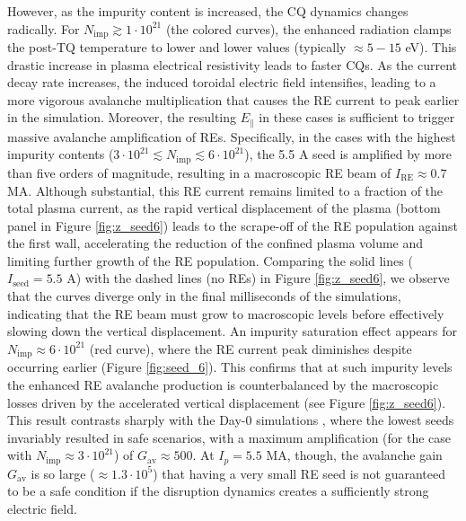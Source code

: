 \documentclass[aip,reprint]{revtex4-1}
\begin{document}
However, as the impurity content is increased, the CQ dynamics changes radically. For $N_\text{imp} \gtrsim 1\cdot10^{21}$ (the colored curves), the enhanced radiation clamps the post-TQ temperature to lower and lower values (typically $\approx 5-15$ eV). This drastic increase in plasma electrical resistivity leads to faster CQs. As the current decay rate increases, the induced toroidal electric field intensifies, leading to a more vigorous avalanche multiplication that causes the RE current to peak earlier in the simulation. Moreover, the resulting $E_\parallel$ in these cases is sufficient to trigger massive avalanche amplification of REs. Specifically, in the cases with the highest impurity contents ($3\cdot10^{21} \lesssim N_\text{imp} \lesssim 6\cdot10^{21}$), the 5.5 A seed is amplified by more than five orders of magnitude, resulting in a macroscopic RE beam of $I_\text{RE} \approx 0.7$ MA. Although substantial, this RE current remains limited to a fraction of the total plasma current, as the rapid vertical displacement of the plasma (bottom panel in Figure \ref{fig:z_seed6}) leads to the scrape-off of the RE population against the first wall, accelerating the reduction of the confined plasma volume and limiting further growth of the RE population. Comparing the solid lines ($I_\text{seed}=5.5$ A) with the dashed lines (no REs) in Figure \ref{fig:z_seed6}, we observe that the curves diverge only in the final milliseconds of the simulations, indicating that the RE beam must grow to macroscopic levels before effectively slowing down the vertical displacement. An impurity saturation effect appears for $N_\text{imp} \approx 6\cdot10^{21}$ (red curve), where the RE current peak diminishes despite occurring earlier (Figure \ref{fig:seed_6}). This confirms that at such impurity levels the enhanced RE avalanche production is counterbalanced by the macroscopic losses driven by the accelerated vertical displacement (see Figure \ref{fig:z_seed6}). This result contrasts sharply with the Day-0 simulations \cite{Emanuelli2025}, where the lowest seeds invariably resulted in safe scenarios, with a maximum amplification (for the case with $N_\text{imp} \approx 3\cdot10^{21}$) of $G_\text{av}\approx500$. At $I_p=5.5$ MA, though, the avalanche gain $G_\text{av}$ is so large ($\approx1.3\cdot10^{5}$) that having a very small RE seed is not guaranteed to be a safe condition if the disruption dynamics creates a sufficiently strong electric field. 
\end{document}
